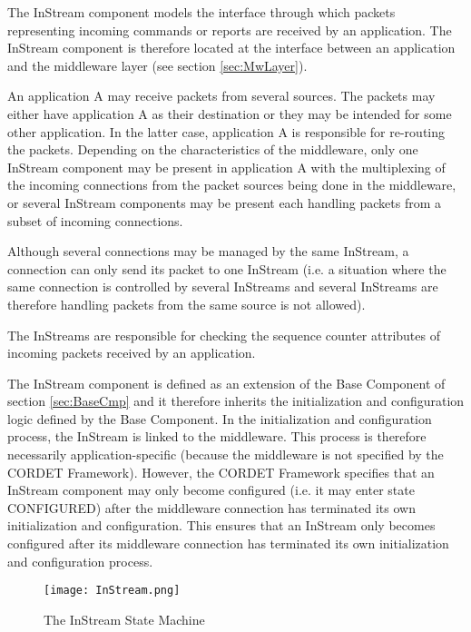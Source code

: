 The InStream component models the interface through which packets representing incoming commands or reports are received by an application. The InStream component is therefore located at the interface between an application and the middleware layer (see section \ref{sec:MwLayer}). 

An application A may receive packets from several sources. The packets may either have application A as their destination or they may be intended for some other application. In the latter case, application A is responsible for re-routing the packets. Depending on the characteristics of the middleware, only one InStream component may be present in application A with the multiplexing of the incoming connections from the packet sources being done in the middleware, or several InStream components may be present each handling packets from a subset of incoming connections. 

Although several connections may be managed by the same InStream, a connection can only send its packet to one InStream (i.e. a situation where the same connection is controlled by several InStreams and several InStreams are therefore handling packets from the same source is not allowed).

The InStreams are responsible for checking the sequence counter attributes of incoming packets received by an application.  

The InStream component is defined as an extension of the Base Component of section \ref{sec:BaseCmp} and it therefore inherits the initialization and configuration logic defined by the Base Component. In the initialization and configuration process, the InStream is linked to the middleware. This process is therefore necessarily application-specific (because the middleware is not specified by the CORDET Framework). However, the CORDET Framework specifies that an InStream component may only become configured (i.e. it may enter state CONFIGURED) after the middleware connection has terminated its own initialization and configuration. This ensures that an InStream only becomes configured after its middleware connection has terminated its own initialization and configuration process.

\begin{figure}[ht]
 \centering
 \texttt{[image: InStream.png]}
 \caption{The InStream State Machine}
 \label{fig:InStream}
\end{figure}

